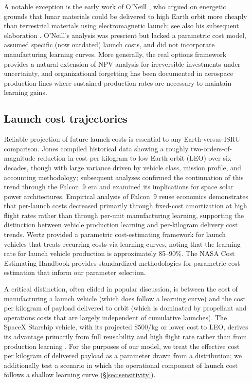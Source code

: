 \documentclass[preprint,12pt]{elsarticle}
\begin{document}
A notable exception is the early work of O'Neill \cite{oneill1974}, who argued on energetic grounds that lunar materials could be delivered to high Earth orbit more cheaply than terrestrial materials using electromagnetic launch; see also his subsequent elaboration \cite{oneill1976}. O'Neill's analysis was prescient but lacked a parametric cost model, assumed specific (now outdated) launch costs, and did not incorporate manufacturing learning curves. More generally, the real options framework \cite{dixit1994} provides a natural extension of NPV analysis for irreversible investments under uncertainty, and organizational forgetting \cite{benkard2000,thompson2012} has been documented in aerospace production lines where sustained production rates are necessary to maintain learning gains.

\subsection{Launch cost trajectories}

Reliable projection of future launch costs is essential to any Earth-versus-ISRU comparison. Jones \cite{jones2018} compiled historical data showing a roughly two-orders-of-magnitude reduction in cost per kilogram to low Earth orbit (LEO) over six decades, though with large variance driven by vehicle class, mission profile, and accounting methodology; subsequent analyses \cite{jones2020,jones2022} confirmed the continuation of this trend through the Falcon~9 era and examined its implications for space solar power architectures. Empirical analysis of Falcon~9 reuse economics \cite{zapata2019} demonstrates that per-launch costs decreased primarily through fixed-cost amortization at high flight rates rather than through per-unit manufacturing learning, supporting the distinction between vehicle production learning and per-kilogram delivery cost trends. Wertz \cite{wertz2011} provided a parametric cost-estimating framework for launch vehicles that treats recurring costs via learning curves, noting that the learning rate for launch vehicle production is approximately 85--90\%. The NASA Cost Estimating Handbook \cite{nasa2015handbook} provides standardized methodologies for parametric cost estimation that inform our parameter selection.

A critical distinction, often elided in popular discussion, is between the cost of manufacturing a launch vehicle (which does follow a learning curve) and the cost per kilogram of payload delivered to orbit (which is dominated by propellant and operations costs that are largely independent of cumulative launches). The SpaceX Starship vehicle, with its projected \$500/kg or lower cost to LEO, derives its advantage primarily from full reusability and high flight rate rather than from production learning \cite{spacex2023,jones2020}. For the purposes of our model, we treat the effective cost per kilogram of delivered payload as a parameter drawn from a distribution; we additionally test a scenario in which the operational component of launch cost follows a shallow learning curve (\S\ref{sec:sensitivity}).
\end{document}
